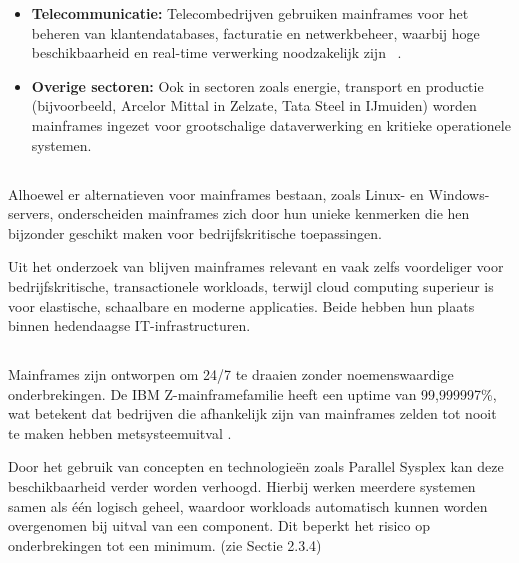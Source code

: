 \begin{itemize}
\item \textbf{Telecommunicatie:} Telecombedrijven gebruiken mainframes voor het beheren van klantendatabases, facturatie en netwerkbeheer, waarbij hoge beschikbaarheid en real-time verwerking noodzakelijk zijn ~\autocite{IBMMainframe}.
\item \textbf{Overige sectoren:} Ook in sectoren zoals energie, transport en productie (bijvoorbeeld, Arcelor Mittal in Zelzate, Tata Steel in IJmuiden) worden mainframes ingezet voor grootschalige dataverwerking en kritieke operationele systemen.

\end{itemize}

\subsection{}
\label{sec:kenmerken-van-mainframe}
Alhoewel er alternatieven voor mainframes bestaan, zoals Linux- en Windows-servers, onderscheiden mainframes zich door hun unieke kenmerken die hen bijzonder geschikt maken voor bedrijfskritische toepassingen.

Uit het onderzoek van \textcite{candido2024_mainframe_cloud} blijven mainframes relevant en vaak zelfs voordeliger voor bedrijfskritische, transactionele workloads, terwijl cloud computing superieur is voor elastische, schaalbare en moderne applicaties. Beide hebben hun plaats binnen hedendaagse IT-infrastructuren.

\subsection{}
\label{sec:beschikbaarheid-en-uptime}
Mainframes zijn ontworpen om 24/7 te draaien zonder noemenswaardige onderbrekingen. De IBM Z-mainframefamilie heeft een uptime van 99,999997\%, wat betekent dat bedrijven die afhankelijk zijn van mainframes zelden tot nooit te maken hebben metsysteemuitval \autocite{IBMMainframe}.

Door het gebruik van concepten en technologieën zoals Parallel Sysplex kan deze beschikbaarheid verder worden verhoogd. Hierbij werken meerdere systemen samen als één logisch geheel, waardoor workloads automatisch kunnen worden overgenomen bij uitval van een component. Dit beperkt het risico op onderbrekingen tot een minimum. (zie Sectie 2.3.4)

